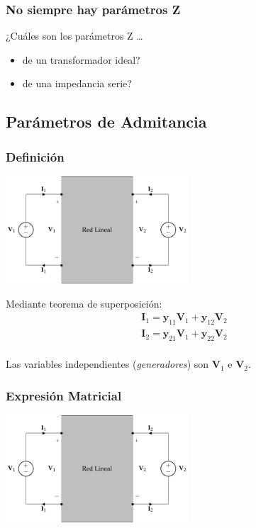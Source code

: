 \subsubsection{No siempre hay parámetros Z}
\label{sec:orga3d8e88}

¿Cuáles son los parámetros Z \ldots{} 

\begin{itemize}
\item de un transformador ideal?
\item de una impedancia serie?
\end{itemize}

\subsection{Parámetros de Admitancia}
\label{sec:orgf2edf7b}
\subsubsection{Definición}
\label{sec:org4be9299}
\begin{center}
\includegraphics[height=4cm]{../figs/cuadripolo_fuentes_tension.pdf}
\end{center}

Mediante teorema de superposición:
\[
\begin{array}{l}
  \mathbf{I}_1 = \mathbf{y}_{11} \mathbf{V}_1 + \mathbf{y}_{12} \mathbf{V}_2\\
  \mathbf{I}_2 = \mathbf{y}_{21} \mathbf{V}_1 + \mathbf{y}_{22} \mathbf{V}_2\\
\end{array}
\]

Las variables independientes (\emph{generadores}) son \(\mathbf{V}_1\) e \(\mathbf{V}_2\).

\subsubsection{Expresión Matricial}
\label{sec:org3731aa9}
\begin{center}
\includegraphics[height=4cm]{../figs/cuadripolo_fuentes_tension.pdf}
\end{center}

